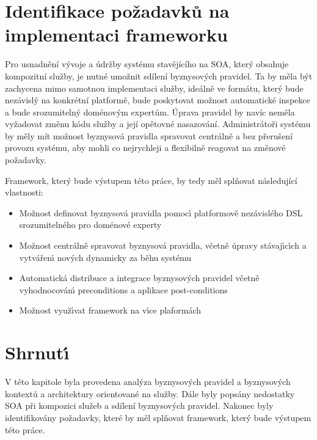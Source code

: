 \section{Identifikace požadavků na implementaci frameworku}\label{sec:implementation-requirements}

Pro usnadnění vývoje a údržby systému stavějícího na \gls{SOA}, který
obsahuje kompozitní služby, je nutné umožnit sdílení byznysových pravidel.
Ta by měla být zachycena mimo samotnou implementaci služby, ideálně ve formátu, který bude nezávislý na
konkrétní platformě, bude poskytovat možnost automatické inspekce a bude srozumitelný doménovým expertům.
Úprava pravidel by navíc neměla vyžadovat změnu kódu služby a její opětovné nasazování.
Administrátoři systému by měly mít možnost byznysová pravidla spravovat centrálně a bez
přerušení provozu systému, aby mohli co nejrychleji a flexibilně reagovat na změnové požadavky.

Framework, který bude výstupem této práce, by tedy měl splňovat následující vlastnosti:

\begin{itemize}
    \item{Možnost definovat byznysová pravidla pomoc\'{\i} platformově nezávislého \gls{DSL} srozumitelného pro doménové experty}
    \item{Možnost centrálně spravovat byznysová pravidla, včetně úpravy stávaj\'{\i}c\'{\i}ch a vytvářen\'{\i} nov\'ych dynamicky za běhu systému}
    \item{Automatická distribuce a integrace byznysových pravidel včetně vyhodnocován\'{\i} preconditions a aplikace post-conditions}
    \item{Možnost využ\'{\i}vat framework na v\'{\i}ce plaformách}
\end{itemize}

\section{Shrnut\'{\i}}

V této kapitole byla provedena analýza byznysov\'ych pravidel a byznysov\'ych kontextů a architektury orientované na služby.
Dále byly popsány nedostatky \gls{SOA} při kompozici služeb a sdílení byznysových pravidel.
Nakonec byly identifikovány požadavky, které by měl splňovat framework, který bude v\'ystupem této práce.
